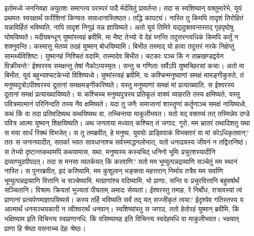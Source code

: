 \adhyAya
{}
\vakya इतोमध्ये जननिवहा अयुतशः समागत्य परस्परं पादै र्मर्दयितुं प्रावर्तन्त। तदा स स्वशिष्यान् वक्तुमारेभे, यूयं प्रथमतः स्वरक्षार्थं फरीशिनां किण्वतः सावधानास्तिष्ठत। तद्धि कापट्यं।
\vakya नास्ति तु किमपि तादृशं तिरोहितं यन्नाविर्हितं भविष्यति, नापि तादृशं निगूढं यन्न ज्ञायिष्यते।
\vakya अतो यूयं तिमिरे यद्यदुक्तवन्तस्तद् गृहपृष्ठेषु घोषयिष्यते।
\vakya मदीयबन्धून् युष्मांस्त्वहं ब्रवीमि, मा भैष्ट तेभ्यो ये देहं घ्नन्ति तदुत्तरन्त्वधिकं किमपि कर्तुं न शक्नुवन्ति।
\vakya कस्मात्तु भेतव्यं तदहं युष्मान् बोधयिष्यामि। बिभीत तस्माद् यो हत्वा तदुत्तरं नरके निक्षेप्तुं सामर्थ्यविशिष्टः। युष्मानहं निश्चितं वदामि, तस्मादेव बिभीत।
\vakya चटकाः पञ्च किं न ताम्रखण्डद्वयेन विक्रीयन्ते? ईश्वरस्य समक्षन्तु तेषां नैकोऽप्यस्मृतः।
\vakya सन्तु च गणिताः सर्वेऽपि युष्मच्छिरसां कचाः। अतो मा बिभीत, यूयं बहुभ्यश्चटकेभ्यो विशिष्यध्वे।
\vakya युष्मांस्त्वहं ब्रवीमि, यः कश्चिन्मनुष्याणां समक्षं मामङ्गीकुरुते, तं मनुष्यपुत्रोऽपीश्वरस्य दूतानां समक्षमङ्गीकरिष्यते।
\vakya यस्तु मनुष्याणां समक्षं मां प्रत्याख्याति, स ईश्वरस्य दूतानां समक्षं प्रत्याख्यायिष्यते।
\vakya यः कश्चिच्च मनुष्यपुत्रस्य प्रतिकूलं वाक्यं व्याहरति तस्य क्षमिष्यते, यस्तु पवित्रमात्मानं परिनिन्दति तस्य नैव क्षमिष्यते।
\vakya यदा तु जनैः समाजानां शास्तॄणां कर्तॄणाञ्च समक्षं नायिष्यध्वे, कथं किं वा तदा प्रतिवदिष्यथ कथयिष्यथ वा, तच्चिन्तया माकुलीभवत।
\vakya यतो यद् वक्तव्यं तत् तस्मिन्नेव दण्डे पवित्र आत्मा युष्मान् शिक्षयिष्यति।
\vakya अथ जनताया मध्यात् कश्चित् तं जगाद, गुरो, मम भ्रातरं तथादिशतु यथा स मया सार्धं रिक्थं विभजेत्।
\vakya स तु तमब्रवीत्, हे मनुष्य, युवयोः प्राड्विवाकं विभक्तारं वा मां कोऽधिकृतवान्?
\vakya ततः स जनानवादीत्, सतर्का भवत सावधानाश्च सर्वस्माद्धनलोभात्, यतो धनाढ्यस्य जीवनं न तद्वित्तनिष्ठं।
\vakya स तेभ्यो दृष्टान्तकथामपि कथयामास, यथा, मनुष्यस्य कस्यचिद् धनिनो भूमिः प्रचुरशस्यादीनि द्रव्याण्युदपीपदत्।
\vakya तदा स मनसा व्यतर्कयत् किं करवाणि? यतो मम भूम्युत्पन्नद्रव्याणि सञ्चेतुं मम स्थानं नास्ति।
\vakya स पुनरब्रवीत्, इदं करिष्यामि, मम कुशूलान् भङ्क्त्वा महत्तरान् निर्माय तत्रैव मम सर्वाणि भूम्युत्पन्नद्रव्याणि वित्तानि च सञ्चेष्यामि,
\vakya मत्प्राणांश्च वदिष्यामि, भो प्राणाः, सन्ति वः प्रचुरवित्तानि बहुवर्षार्थं सञ्चितानि। विश्रामः क्रियतां भुज्यतां पीयताम् अमादः सेव्यतां।
\vakya ईश्वरस्तु तमाह, रे निर्बोध, रात्रावस्यां त्वं प्राणानां प्रत्यर्पणमाज्ञापयिष्यसे। कस्य तर्हि भविष्यति सर्वं तद् यत् सज्जीकृतं त्वया?
\vakya ईदृश्येव गतिस्तस्य य आत्मार्थं धनसञ्चयकारी न त्वीश्वरार्थं धनवान्।
\vakya स्वशिष्यांस्तु स जगाद, ततो हेतोरहं युष्मान् ब्रवीमि, किं भक्षिष्याम इति विचिन्त्य स्वप्राणानधि, किं वसिष्यामह इति विचिन्त्य स्वदेहमधि वा माकुलीभवत।
\vakya भक्ष्यात् प्राणा हि श्रेष्ठा वसनाच्च देहः श्रेष्ठः।

